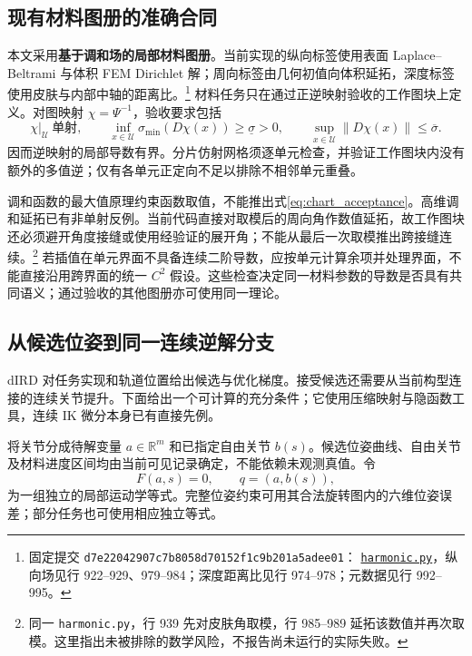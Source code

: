 \documentclass[UTF8,fontset=fandol,zihao=5,a4paper]{ctexart}
\newcommand{\R}{\mathbb R}\newcommand{\N}{\mathcal N}
\theoremstyle{definition}
\theoremstyle{remark}\newtheorem{remark}[theorem]{说明}
\numberwithin{equation}{section}
\begin{document}
\subsection{现有材料图册的准确合同}
本文采用\textbf{基于调和场的局部材料图册}。当前实现的纵向标签使用表面 Laplace--Beltrami 与体积 FEM Dirichlet 解；周向标签由几何初值向体积延拓，深度标签使用皮肤与内部中轴的距离比。\footnote{固定提交 \texttt{d7e22042907c7b8058d70152f1c9b201a5adee01}：
\href{https://github.com/NingMeng0903/RealUS_playground/blob/d7e22042907c7b8058d70152f1c9b201a5adee01/src/projects/genesis_ue_sync/anatomy_retarget/leg_volume_coordinates/harmonic.py}{\texttt{harmonic.py}}，纵向场见行 922--929、979--984；深度距离比见行 974--978；元数据见行 992--995。}
材料任务只在通过正逆映射验收的工作图块上定义。对图映射 $\chi=\Psi^{-1}$，验收要求包括
\begin{equation}
 \chi|_{\mathcal U}\ \text{单射},\qquad
 \inf_{x\in\mathcal U}\sigma_{\min}(D\chi(x))\ge\underline\sigma>0,
 \qquad
 \sup_{x\in\mathcal U}\|D\chi(x)\|\le\overline\sigma .
 \label{eq:chart_acceptance}
\end{equation}
因而逆映射的局部导数有界。分片仿射网格须逐单元检查，并验证工作图块内没有额外的多值逆；仅有各单元正定向不足以排除不相邻单元重叠。

调和函数的最大值原理约束函数取值，不能推出式\eqref{eq:chart_acceptance}。高维调和延拓已有非单射反例\cite{laugesen}。当前代码直接对取模后的周向角作数值延拓，故工作图块还必须避开角度接缝或使用经验证的展开角；不能从最后一次取模推出跨接缝连续。\footnote{同一 \texttt{harmonic.py}，行 939 先对皮肤角取模，行 985--989 延拓该数值并再次取模。这里指出未被排除的数学风险，不报告尚未运行的实际失败。}
若插值在单元界面不具备连续二阶导数，应按单元计算余项并处理界面，不能直接沿用跨界面的统一 $C^2$ 假设。这些检查决定同一材料参数的导数是否具有共同语义；通过验收的其他图册亦可使用同一理论。

\subsection{从候选位姿到同一连续逆解分支}
dIRD 对任务实现和轨道位置给出候选与优化梯度。接受候选还需要从当前构型连接的连续关节提升。下面给出一个可计算的充分条件；它使用压缩映射与隐函数工具，连续 IK 微分本身已有直接先例\cite{cohn2026}。

将关节分成待解变量 $a\in\R^m$ 和已指定自由关节 $b(s)$。候选位姿曲线、自由关节及材料进度区间均由当前可见记录确定，不能依赖未观测真值。令
\begin{equation}
 F(a,s)=0,\qquad q=(a,b(s)),
 \label{eq:ik_equation}
\end{equation}
为一组独立的局部运动学等式。完整位姿约束可用其合法旋转图内的六维位姿误差；部分任务也可使用相应独立等式。
\end{document}
